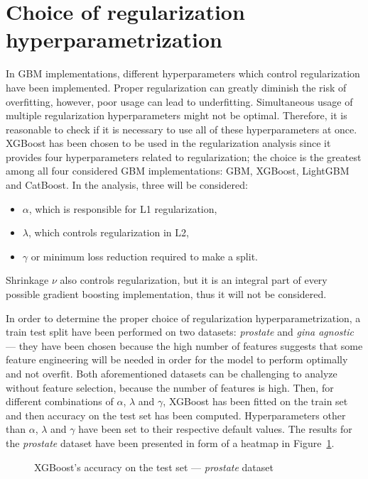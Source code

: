 \documentclass[magisterska, english]{pwr_wmat_praca_dyplomowa}
\theoremstyle{plain}
\numberwithin{theorem}{chapter}
\theoremstyle{definition}
\numberwithin{theorem}{chapter}
\begin{document}
\section{Choice of regularization hyperparametrization}\label{section:xgboost_regularization}
In GBM implementations, different hyperparameters which control regularization have been implemented. Proper regularization can greatly diminish the risk of overfitting, however, poor usage can lead to underfitting. Simultaneous usage of multiple regularization hyperparameters might not be optimal. Therefore, it is reasonable to check if it is necessary to use all of these hyperparameters at once.
XGBoost has been chosen to be used in the regularization analysis since it provides four hyperparameters related to regularization; the choice is the greatest among all four considered GBM implementations: GBM, XGBoost, LightGBM and CatBoost. In the analysis, three will be considered:
\begin{itemize}
\item $\alpha$, which is responsible for L1 regularization,
\item $\lambda$, which controls regularization in L2,
\item $\gamma$ or minimum loss reduction required to make a split.
\end{itemize}

Shrinkage $\nu$ also controls regularization, but it is an integral part of every possible gradient boosting implementation, thus it will not be considered.

In order to determine the proper choice of regularization hyperparametrization, a train test split have been performed on two datasets: \emph{prostate} and \emph{gina agnostic} --- they have been chosen because the high number of features suggests that some feature engineering will be needed in order for the model to perform optimally and not overfit. Both aforementioned datasets can be challenging to analyze without feature selection, because the number of features is high. Then, for different combinations of $\alpha$, $\lambda$ and $\gamma$, XGBoost has been fitted on the train set and then accuracy on the test set has been computed. Hyperparameters other than $\alpha$, $\lambda$ and $\gamma$ have been set to their respective default values. The results for the \emph{prostate} dataset have been presented in form of a heatmap in Figure~\ref{fig:regularization_prostate}.

\begin{figure}[H]
	\centering
	\caption{XGBoost's accuracy on the test set --- \emph{prostate} dataset}
	\label{fig:regularization_prostate}
\end{figure}
\end{document}
